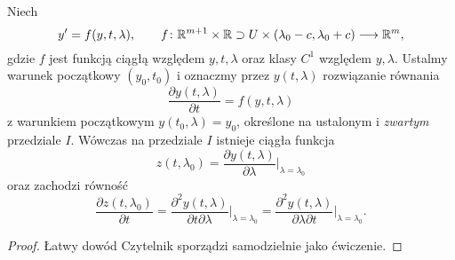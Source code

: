 %
\begin{theorem}
  Niech
%
  \begin{equation*}
    y' = f(y,t,\lambda), \qquad
    f \colon \mathbb{R}^{m+1} \times \mathbb{R} \supset U \times (\lambda_0 - c, \lambda_0 + c) \longrightarrow \mathbb{R}^m,
  \end{equation*}
%
  gdzie $f$ jest funkcją ciągłą względem $y,t,\lambda$ oraz klasy $C^1$ względem $y,\lambda$. Ustalmy warunek 
  początkowy $(y_0,t_0)$ i oznaczmy przez $y(t,\lambda)$ rozwiązanie równania
%
  \begin{equation*}
    \frac{\partial y(t,\lambda)}{\partial t} = f(y,t,\lambda)
  \end{equation*}
%
  z warunkiem początkowym $y(t_0,\lambda) = y_0$, określone na ustalonym i \emph{zwartym} przedziale $I$. Wówczas na 
  przedziale $I$ istnieje ciągła funkcja
%
  \begin{equation*}
    z(t,\lambda_0) = \frac{\partial y(t,\lambda)}{\partial \lambda} \Big\vert_{\lambda = \lambda_0}
  \end{equation*}
%
  oraz zachodzi równość
%
  \begin{equation*}
    \frac{\partial z(t,\lambda_0)}{\partial t} =
    \frac{\partial^2 y(t,\lambda)}{\partial t \partial \lambda} \Big\vert_{\lambda = \lambda_0} =
    \frac{\partial^2 y(t,\lambda)}{\partial \lambda \partial t} \Big\vert_{\lambda = \lambda_0}.
  \end{equation*}
\end{theorem}

\begin{proof}
  Łatwy dowód Czytelnik sporządzi samodzielnie jako ćwiczenie.
\end{proof}
































